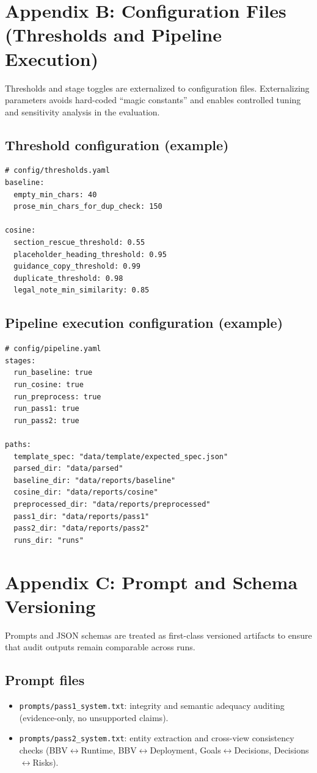 \section{Appendix B: Configuration Files (Thresholds and Pipeline Execution)}
\label{app:config_files}

Thresholds and stage toggles are externalized to configuration files. Externalizing parameters avoids hard-coded ``magic constants'' and enables controlled tuning and sensitivity analysis in the evaluation.

\subsection{Threshold configuration (example)}
\begin{verbatim}
# config/thresholds.yaml
baseline:
  empty_min_chars: 40
  prose_min_chars_for_dup_check: 150

cosine:
  section_rescue_threshold: 0.55
  placeholder_heading_threshold: 0.95
  guidance_copy_threshold: 0.99
  duplicate_threshold: 0.98
  legal_note_min_similarity: 0.85
\end{verbatim}

\subsection{Pipeline execution configuration (example)}
\begin{verbatim}
# config/pipeline.yaml
stages:
  run_baseline: true
  run_cosine: true
  run_preprocess: true
  run_pass1: true
  run_pass2: true

paths:
  template_spec: "data/template/expected_spec.json"
  parsed_dir: "data/parsed"
  baseline_dir: "data/reports/baseline"
  cosine_dir: "data/reports/cosine"
  preprocessed_dir: "data/reports/preprocessed"
  pass1_dir: "data/reports/pass1"
  pass2_dir: "data/reports/pass2"
  runs_dir: "runs"
\end{verbatim}


\section{Appendix C: Prompt and Schema Versioning}
\label{app:prompt_schema_versioning}

Prompts and JSON schemas are treated as first-class versioned artifacts to ensure that audit outputs remain comparable across runs.

\subsection{Prompt files}
\begin{itemize}
    \item \texttt{prompts/pass1\_system.txt}: integrity and semantic adequacy auditing (evidence-only, no unsupported claims).
    \item \texttt{prompts/pass2\_system.txt}: entity extraction and cross-view consistency checks (BBV$\leftrightarrow$Runtime, BBV$\leftrightarrow$Deployment, Goals$\leftrightarrow$Decisions, Decisions$\leftrightarrow$Risks).
\end{itemize}

